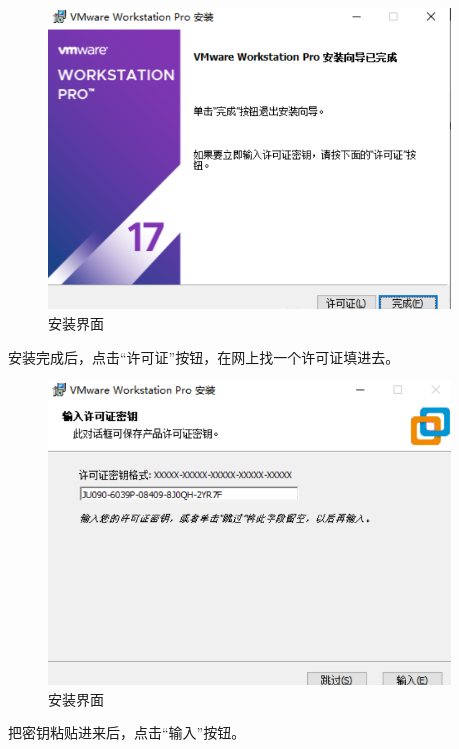 \documentclass[UTF8]{ctexart}
\begin{document}
\begin{figure}[H]
    \centering
    \includegraphics[width=0.95\textwidth]{picture/Screenshot 2024-10-14 110329.png}
    \caption{安装界面}
\end{figure}
安装完成后，点击“许可证”按钮，在网上找一个许可证填进去。

\begin{figure}[H]
    \centering
    \includegraphics[width=0.95\textwidth]{picture/Screenshot 2024-10-14 110401.png}
    \caption{安装界面}
\end{figure}
把密钥粘贴进来后，点击“输入”按钮。
\end{document}
